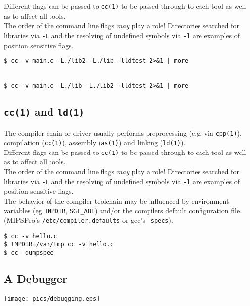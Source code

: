 \documentclass[xga]{xdvislides}
\begin{document}
Different flags can be passed to {\tt cc(1)} to be passed through to each tool
as well as to affect all tools.  \\

The order of the command line flags {\em may} play a role!
Directories searched for libraries via {\tt -L} and the resolving of undefined
symbols via {\tt -l} are examples of position sensitive flags.
\\

\begin{verbatim}
$ cc -v main.c -L./lib2 -L./lib -lldtest 2>&1 | more


$ cc -v main.c -L./lib -L./lib2 -lldtest 2>&1 | more
\end{verbatim}


\subsection{{\tt cc(1)} and {\tt ld(1)}}

The compiler chain or driver usually performs
preprocessing (e.g. via {\tt cpp(1)}), compilation
({\tt cc(1)}), assembly ({\tt as(1)}) and linking
({\tt ld(1)}).
\\

Different flags can be passed to {\tt cc(1)} to be passed through to each tool
as well as to affect all tools.  \\

The order of the command line flags {\em may} play a role!
Directories searched for libraries via {\tt -L} and the resolving of undefined
symbols via {\tt -l} are examples of position sensitive flags.
\\

The behavior of the compiler toolchain may be influenced by environment
variables (eg {\tt TMPDIR}, {\tt SGI\_ABI}) and/or the compilers default
configuration file (MIPSPro's {\tt /etc/compiler.defaults} or gcc's {\tt
specs}).

\begin{verbatim}
$ cc -v hello.c
$ TMPDIR=/var/tmp cc -v hello.c
$ cc -dumpspec
\end{verbatim}

\subsection{A Debugger}
\vspace*{\fill}
\begin{center}
	\texttt{[image: pics/debugging.eps]}
\end{center}
\vspace*{\fill}
\end{document}

